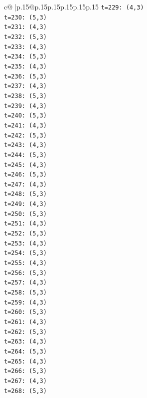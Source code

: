 \documentclass{article}
\begin{document}
{\begin{supertabular}{c@{$\;$}|p{.15\linewidth}@{}p{.15\linewidth}p{.15\linewidth}p{.15\linewidth}p{.15\linewidth}p{.15\linewidth}}
{{{\texttt{t=229: (4,3)} \\
\texttt{t=230: (5,3)} \\
\texttt{t=231: (4,3)} \\
\texttt{t=232: (5,3)} \\
\texttt{t=233: (4,3)} \\
\texttt{t=234: (5,3)} \\
\texttt{t=235: (4,3)} \\
\texttt{t=236: (5,3)} \\
\texttt{t=237: (4,3)} \\
\texttt{t=238: (5,3)} \\
\texttt{t=239: (4,3)} \\
\texttt{t=240: (5,3)} \\
\texttt{t=241: (4,3)} \\
\texttt{t=242: (5,3)} \\
\texttt{t=243: (4,3)} \\
\texttt{t=244: (5,3)} \\
\texttt{t=245: (4,3)} \\
\texttt{t=246: (5,3)} \\
\texttt{t=247: (4,3)} \\
\texttt{t=248: (5,3)} \\
\texttt{t=249: (4,3)} \\
\texttt{t=250: (5,3)} \\
\texttt{t=251: (4,3)} \\
\texttt{t=252: (5,3)} \\
\texttt{t=253: (4,3)} \\
\texttt{t=254: (5,3)} \\
\texttt{t=255: (4,3)} \\
\texttt{t=256: (5,3)} \\
\texttt{t=257: (4,3)} \\
\texttt{t=258: (5,3)} \\
\texttt{t=259: (4,3)} \\
\texttt{t=260: (5,3)} \\
\texttt{t=261: (4,3)} \\
\texttt{t=262: (5,3)} \\
\texttt{t=263: (4,3)} \\
\texttt{t=264: (5,3)} \\
\texttt{t=265: (4,3)} \\
\texttt{t=266: (5,3)} \\
\texttt{t=267: (4,3)} \\
\texttt{t=268: (5,3)} \\
}}}
\end{supertabular}}
\end{document}
